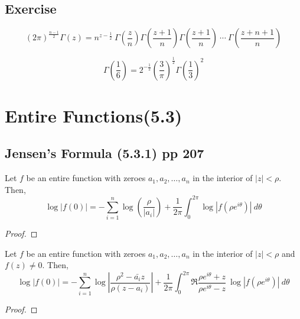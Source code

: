 \subsection*{Exercise}
\begin{remark}
	\begin{equation}
		(2\pi)^\frac{n-1}{2} \Gamma(z) = n^{z-\frac{1}{2}} \ \Gamma\left(\frac{z}{n}\right) \Gamma\left(\frac{z+1}{n}\right) \Gamma\left(\frac{z+1}{n}\right) \ \dotsm \ \Gamma\left(\frac{z+n+1}{n}\right)
	\end{equation}
\end{remark}

\begin{remark}
	\begin{equation}
		\Gamma\left(\frac{1}{6}\right) = 2^{-\frac{1}{2}} \left( \frac{3}{\pi}\right)^\frac{1}{2} \Gamma\left(\frac{1}{3}\right)^2
	\end{equation}
\end{remark}

\section{Entire Functions(5.3)}
\subsection{Jensen's Formula (5.3.1) pp 207}
\begin{remark}
	Let $f$ be an entire function with zeroes $a_1,a_2,\dots,a_n$ in the interior of $|z| < \rho$.
	Then,
	\begin{equation}
		\log |f(0)| = -\sum_{i=1}^n \log \left( \frac{\rho}{|a_i|} \right) + \frac{1}{2\pi} \int_0^{2\pi} \log \left| f\left(\rho e^{i\theta}\right) \right| \ d\theta
	\end{equation}
\end{remark}
\begin{proof}
\end{proof}
\begin{remark}
	Let $f$ be an entire function with zeroes $a_1,a_2,\dots,a_n$ in the interior of $|z| < \rho$ and $f(z) \ne 0$.
	Then,
	\begin{equation}
		\log |f(0)| = -\sum_{i=1}^n \log \left| \frac{\rho^2-\bar{a_i}z}{\rho(z-a_i)} \right| + \frac{1}{2\pi} \int_0^{2\pi} \Re \frac{\rho e^{i \theta}+z}{\rho e^{i \theta} - z}\ \log \left| f\left(\rho e^{i\theta}\right) \right| \ d\theta
	\end{equation}
\end{remark}
\begin{proof}
\end{proof}

